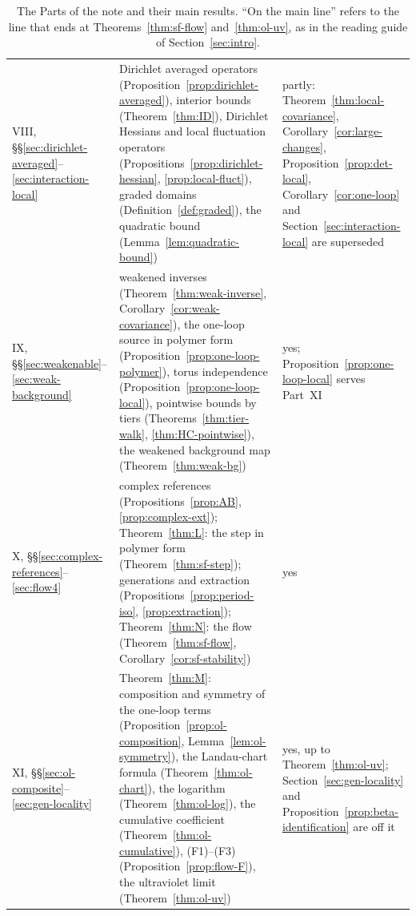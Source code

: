 \begin{table}[tbp]
\begin{tabular}{|p{}|p{}|p{}|}
VIII, \S\S\ref{sec:dirichlet-averaged}--\ref{sec:interaction-local} & \raggedright Dirichlet averaged operators (Proposition~\ref{prop:dirichlet-averaged}), interior bounds (Theorem~\ref{thm:ID}), Dirichlet Hessians and local fluctuation operators (Propositions~\ref{prop:dirichlet-hessian}, \ref{prop:local-fluct}), graded domains (Definition~\ref{def:graded}), the quadratic bound (Lemma~\ref{lem:quadratic-bound}) & \raggedright partly: Theorem~\ref{thm:local-covariance}, Corollary~\ref{cor:large-changes}, Proposition~\ref{prop:det-local}, Corollary~\ref{cor:one-loop} and Section~\ref{sec:interaction-local} are superseded\tabularnewline
IX, \S\S\ref{sec:weakenable}--\ref{sec:weak-background} & \raggedright weakened inverses (Theorem~\ref{thm:weak-inverse}, Corollary~\ref{cor:weak-covariance}), the one-loop source in polymer form (Proposition~\ref{prop:one-loop-polymer}), torus independence (Proposition~\ref{prop:one-loop-local}), pointwise bounds by tiers (Theorems~\ref{thm:tier-walk}, \ref{thm:HC-pointwise}), the weakened background map (Theorem~\ref{thm:weak-bg}) & \raggedright yes; Proposition~\ref{prop:one-loop-local} serves Part~XI\tabularnewline
X, \S\S\ref{sec:complex-references}--\ref{sec:flow4} & \raggedright complex references (Propositions~\ref{prop:AB}, \ref{prop:complex-ext}); Theorem~\ref{thm:L}: the step in polymer form (Theorem~\ref{thm:sf-step}); generations and extraction (Propositions~\ref{prop:period-iso}, \ref{prop:extraction}); Theorem~\ref{thm:N}: the flow (Theorem~\ref{thm:sf-flow}, Corollary~\ref{cor:sf-stability}) & yes\tabularnewline
XI, \S\S\ref{sec:ol-composite}--\ref{sec:gen-locality} & \raggedright Theorem~\ref{thm:M}: composition and symmetry of the one-loop terms (Proposition~\ref{prop:ol-composition}, Lemma~\ref{lem:ol-symmetry}), the Landau-chart formula (Theorem~\ref{thm:ol-chart}), the logarithm (Theorem~\ref{thm:ol-log}), the cumulative coefficient (Theorem~\ref{thm:ol-cumulative}), (F1)--(F3) (Proposition~\ref{prop:flow-F}), the ultraviolet limit (Theorem~\ref{thm:ol-uv}) & \raggedright yes, up to Theorem~\ref{thm:ol-uv}; Section~\ref{sec:gen-locality} and Proposition~\ref{prop:beta-identification} are off it\tabularnewline
\hline
\end{tabular}
\caption{The Parts of the note and their main results. ``On the main line'' refers to the line that ends at Theorems~\ref{thm:sf-flow} and~\ref{thm:ol-uv}, as in the reading guide of Section~\ref{sec:intro}.}\label{tab:G-parts}
\end{table}

